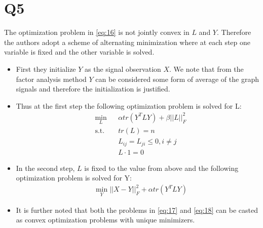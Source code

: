 \documentclass{article}
\begin{document}
\section*{Q5}
The optimization problem in \ref{eq:16} is not jointly convex in $L$ and $Y$. Therefore the authors adopt a scheme of alternating minimization where at each step one variable is fixed and the other variable is solved.
\begin{itemize}
\item First they initialize $Y$ as the signal observation $X$. We note that from the factor analysis method $Y$ can be considered some form of average of the graph signals and therefore the initialization is justified.
\item Thus at the first step the following optimization problem is solved for L:
  \begin{equation}
    \label{eq:17}
    \begin{aligned}
      & \min_L
      & & \alpha tr(Y^T L Y) + \beta ||L||_F^2 \\
      & \text{s.t.}
      & & tr(L) = n \\
      &&& L_{ij} = L_{ji} \le 0, i \ne j \\
      &&& L \cdot 1 = 0
    \end{aligned}
  \end{equation}
\item In the second step, $L$ is fixed to the value from above and the following optimization problem is solved for Y:
  \begin{equation}
    \label{eq:18}
    \begin{aligned}
      & \min_Y ||X - Y||_F^2 + \alpha tr(Y^T L Y)
    \end{aligned}
  \end{equation}
\item It is further noted that both the problems in \ref{eq:17} and \ref{eq:18} can be casted as convex optimization problems with unique minimizers.
\end{itemize}
\end{document}
